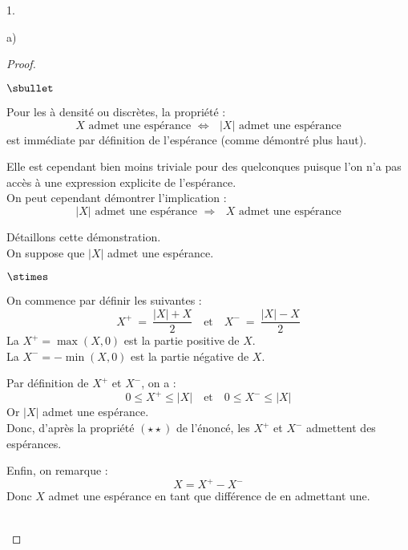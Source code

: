 \documentclass[11pt]{article}%
\begin{document}
\begin{noliste}{1.}
\begin{noliste}{a)}
\begin{proof}
      \begin{remark}
        \begin{noliste}{$\sbullet$}
	  \item Pour les \var à densité ou discrètes, la propriété :
	  \[
	    \text{$X$ admet une espérance \ $\Leftrightarrow$ \ $\vert 
	    X \vert$ admet une espérance}
	  \]
	  est immédiate par définition de l'espérance (comme 
	  démontré plus haut).
	  
	  \item Elle est cependant bien moins triviale pour des \var 
	  quelconques puisque l'on n'a pas accès à une expression 
	  explicite de l'espérance.\\
	  On peut cependant démontrer l'implication :
	  \[
	    \text{$\vert X \vert$ admet une espérance \ $\Rightarrow$ \ 
	    $X$ admet une espérance}
	  \]
        \item Détaillons cette démonstration.\\
          On suppose que $\vert X \vert$ admet une espérance.
	  \begin{noliste}{$\stimes$}
	    \item On commence par définir les \var suivantes :
	    \[
	      X^+ \ = \ \dfrac{\vert X \vert +X}{2} \quad \text{et} 
	      \quad X^- \ = \ \dfrac{\vert X \vert -X}{2}
	    \]
	    La \var $X^+=\max(X,0)$ est la partie positive de $X$.\\
	    La \var $X^-=-\min(X,0)$ est la partie négative de $X$.
	    
	    \item Par définition de $X^+$ et $X^-$, on a :
	    \[
	      0 \leq X^+ \leq \vert X \vert \quad \text{et} \quad 
	      0 \leq X^- \leq \vert X \vert
	    \]
	    Or $\vert X \vert$ admet une espérance.\\
	    Donc, d'après la propriété $(\star \star)$ de l'énoncé, les 
	    \var 
	    $X^+$ et 
	    $X^-$ admettent des espérances.
	    
	    \item Enfin, on remarque :
	    \[
	      X = X^+ - X^-
	    \]
	    Donc $X$ admet une espérance en tant que différence de \var 
	    en admettant une.
	  \end{noliste}
	\end{noliste}
      \end{remark}~\\[-1.4cm]
    \end{proof}
    
    
    \newpage
    

\end{noliste}
\end{noliste}
\end{document}
